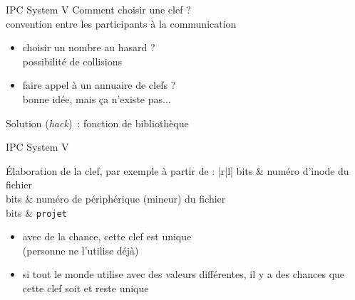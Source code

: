\begin {frame} {IPC System V}
    Comment choisir une clef ? \\
    \implique convention entre les participants à la
    communication

    \begin {itemize}
	\item choisir un nombre au hasard ? \\
	    \implique possibilité de collisions

	\item faire appel à un annuaire de clefs ? \\
	    \implique bonne idée, mais ça n'existe pas...
    \end {itemize}

    Solution (\textit {hack})~: fonction de bibliothèque 

\end {frame}

\begin {frame} {IPC System V}

    \vspace* {3mm}

    Élaboration de la clef, par exemple à partir de :
    \ctableau {} {|r|l|} {
	 bits & numéro d'inode du fichier \\
	 bits & numéro de périphérique (mineur) du fichier \\
	 bits & \texttt {projet} \\
    }

    \vspace* {3mm}

    \begin {itemize}
	\item avec de la chance, cette clef est unique
	    \\
	    (personne ne l'utilise déjà)
	\item si tout le monde utilise  avec des valeurs
	    différentes, il y a des chances que cette clef soit et reste unique
    \end {itemize}


\end {frame}

